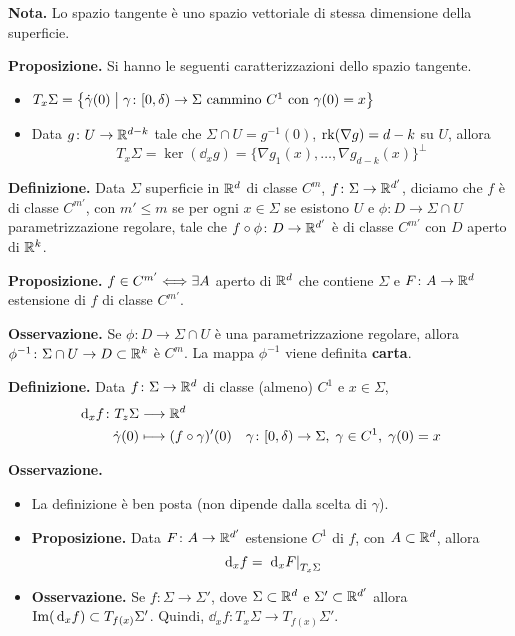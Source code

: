 \textbf{Nota.} Lo spazio tangente è uno spazio vettoriale di stessa dimensione della superficie.

\textbf{Proposizione.} Si hanno le seguenti caratterizzazioni dello spazio tangente.
\begin{itemize}

	\item $T_x \Sigma = \left\{ \dot \gamma(0) \;\middle|\; \gamma \colon [0,\delta) \to \Sigma \text{ cammino } C^1 \text{ con } \gamma(0) = x \right\}$ 


	\item Data $g \colon U \to \mathbb R^{d-k}$ tale che $\Sigma \cap U = g^{-1}(0)$, $\operatorname{rk}(\nabla g) = d-k$ su $U$, allora 
	$$
		T_x \Sigma = \ker(\dd_x g) = \{\nabla g_1(x),\ldots, \nabla g_{d-k}(x) \}^\perp
	$$
	
\end{itemize}


\textbf{Definizione.} Data $\Sigma$ superficie in $\mathbb R^d$ di classe $C^m$, $f \colon \Sigma \to \mathbb R^{d'}$, diciamo che $f$ è di classe $C^{m'}$, con $m' \leq m$ se per ogni $x \in \Sigma$ se esistono $U$ e $\phi \colon D \to \Sigma \cap U$ parametrizzazione regolare, tale che $f \circ \phi \colon D \to \mathbb R^{d'}$ è di classe $C^{m'}$ con $D$ aperto di $\mathbb R^k$.


\textbf{Proposizione.} $f \in C^{m'} \Longleftrightarrow \exists A$ aperto di $\mathbb R^d$ che contiene $\Sigma$ e $F \colon A \to \mathbb R^d$ estensione di $f$ di classe $C^{m'}$.

\textbf{Osservazione.} Se $\phi \colon D \to \Sigma \cap U$ è una parametrizzazione regolare, allora $\phi^{-1} \colon \Sigma \cap U \to D \subset \mathbb R^k$ è $C^m$. La mappa $\phi^{-1}$ viene definita \textbf{carta}.

\textbf{Definizione.} Data $f \colon \Sigma \to \mathbb R^{d}$ di classe (almeno) $C^1$ e $x \in \Sigma$, 
%
\begin{align*}
	\,\mathrm{d}_x f \colon  T_z \Sigma & \longrightarrow \mathbb R^{d} \\
	\dot \gamma(0) & \longmapsto (f \circ \gamma)' (0) \quad \gamma \colon [0,\delta) \to \Sigma, \; \gamma \in C^1, \; \gamma(0) = x
\end{align*}

\textbf{Osservazione.}
\begin{itemize}

	\item La definizione è ben posta (non dipende dalla scelta di $\gamma$).

	\item \textbf{Proposizione.} Data $F \colon A \to \mathbb R^{d'}$ estensione $C^1$ di $f$, con $A \subset \mathbb R^d$, allora
	$$
		\,\mathrm{d}_x f = \left.\,\mathrm{d}_x F\right|_{T_x \Sigma}
	$$

	\item \textbf{Osservazione.} Se $f \colon \Sigma \to \Sigma'$, dove $\Sigma \subset \mathbb R^d$ e $\Sigma' \subset \mathbb R^{d'}$ allora $\operatorname{Im}(\,\mathrm{d}_x f) \subset T_{f(x)} \Sigma'$.
	Quindi, $\dd_x f \colon T_x \Sigma \to T_{f(x)} \Sigma'$.

\end{itemize}




